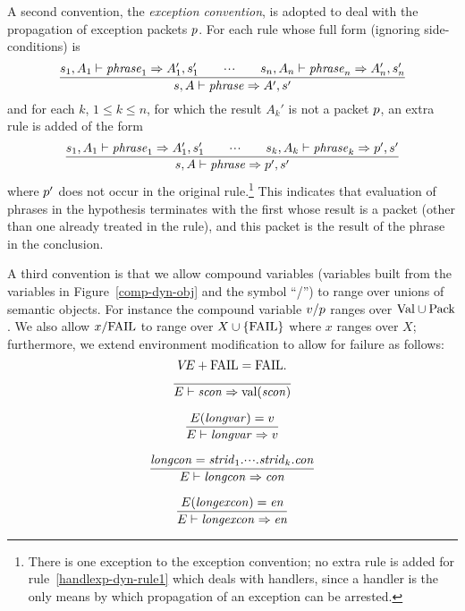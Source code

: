 A second convention, the {\sl exception convention}, is adopted to deal
with the propagation of exception packets $p$.
For each rule whose full form (ignoring side-conditions) is
\[ \frac{ s_1,A_1\vdash{\it phrase}_1\Rightarrow A_1',s_1'\qquad\mbox{$\cdot\!\cdot\!\cdot$}\qquad
          s_n,A_n\vdash{\it phrase}_n\Rightarrow A_n',s_n' }
        { s,A\vdash{\it phrase}\Rightarrow A',s'} \]
and for each $k$, $1\leq k\leq n$, for which the result $A_k'$ is not a
packet $p$, an extra rule is added of the form
\[ \frac{ s_1,A_1\vdash{\it phrase}_1\Rightarrow A_1',s_1'\qquad\mbox{$\cdot\!\cdot\!\cdot$}\qquad
          s_k,A_k\vdash{\it phrase}_k\Rightarrow p',s' }
        { s,A\vdash{\it phrase}\Rightarrow p',s'} \]
where $p'$ does not occur in the original rule.\footnote{There is one
exception to the exception convention; no extra rule is added for
rule~\ref{handlexp-dyn-rule1} which deals with handlers, 
since a handler is the only
means by which propagation of an exception can be arrested.}
This indicates that evaluation of phrases in the hypothesis terminates with the
first whose result is a packet (other than one already treated in the rule),
and this packet is the result of the phrase in the conclusion.

A third convention is that we allow compound variables (variables built
from the variables in Figure~\ref{comp-dyn-obj} and the symbol ``/'')
to range over unions of semantic objects. For instance 
the compound variable $v/p$ ranges
over ${\rm Val}\cup{\rm Pack}$. 
We also allow $x/{\rm FAIL}$ to range over $X\cup\{{\rm FAIL}\}$ where $x$ 
ranges over $X$;
furthermore, we extend environment modification to allow for failure
as follows:
\[\mbox{$V\!E$}+{\rm FAIL}={\rm FAIL}.\]
%
%
\begin{equation}	%
\frac{}
     {\E\ts\scon\ra\sconval(\scon)}\index{51.15}
\end{equation}

\begin{equation}	%
\frac{\E(\longvar)=\V}
     {\E\ts\longvar\ra\V}\index{51.2}
\end{equation}

\begin{equation}	%
\label{conexp-dyn-rule}
\frac{\longcon=\strid_1.\cdots.\strid_k.\con}
     {\E\ts\longcon\ra\con}\index{52.1}
\end{equation}

\begin{equation}       %
\label{exconexp-dyn-rule}
\frac{\E(\longexn)=\e}
     {\E\ts\longexn\ra\e}
\end{equation}



